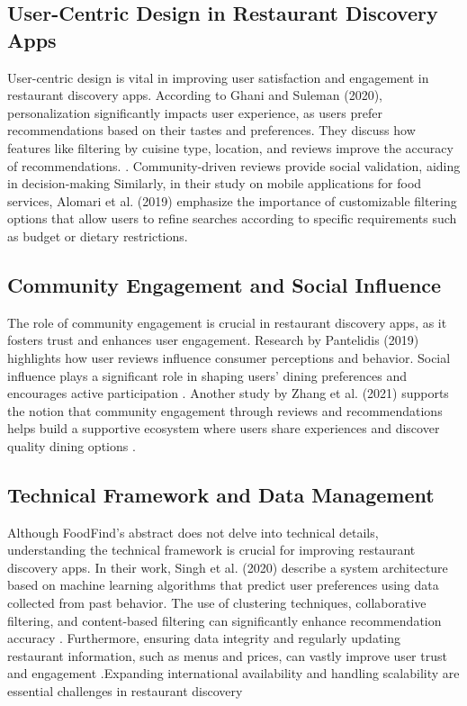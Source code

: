 \documentclass[12pt, a4paper, oneside]{article}
\begin{document}
\subsection{User-Centric Design in Restaurant Discovery Apps}
User-centric design is vital in improving user satisfaction and engagement in restaurant discovery apps. According to Ghani and Suleman (2020), personalization significantly impacts user experience, as users prefer recommendations based on their tastes and preferences. They discuss how features like filtering by cuisine type, location, and reviews improve the accuracy of recommendations. \cite{ghani2020restaurant}. 
 Community-driven reviews provide social validation, aiding in decision-making \cite{pantelidis2019social}Similarly, in their study on mobile applications for food services, Alomari et al. (2019) emphasize the importance of customizable filtering options that allow users to refine searches according to specific requirements such as budget or dietary restrictions\cite{alomari2019mobile}.

\subsection{Community Engagement and Social Influence}
The role of community engagement is crucial in restaurant discovery apps, as it fosters trust and enhances user engagement. Research by Pantelidis (2019) highlights how user reviews influence consumer perceptions and behavior. Social influence plays a significant role in shaping users' dining preferences and encourages active participation \cite{pantelidis2019social}. Another study by Zhang et al. (2021) supports the notion that community engagement through reviews and recommendations helps build a supportive ecosystem where users share experiences and discover quality dining options  \cite{zhang2021food}.

\subsection{Technical Framework and Data Management}
Although FoodFind's abstract does not delve into technical details, understanding the technical framework is crucial for improving restaurant discovery apps. In their work, Singh et al. (2020) describe a system architecture based on machine learning algorithms that predict user preferences using data collected from past behavior. The use of clustering techniques, collaborative filtering, and content-based filtering can significantly enhance recommendation accuracy \cite{singh2020restaurant}. Furthermore, ensuring data integrity and regularly updating restaurant information, such as menus and prices, can vastly improve user trust and engagement \cite{serrano2020food}.Expanding international availability and handling scalability are essential challenges in restaurant discovery \cite{bianchini2017restaurant}
\end{document}
